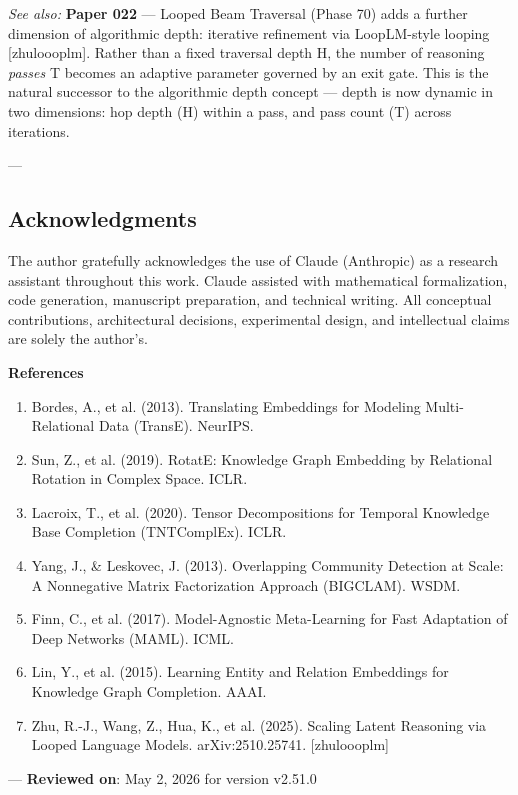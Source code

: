 \textit{See also:} \textbf{Paper 022} — Looped Beam Traversal (Phase 70) adds a further dimension of algorithmic depth: iterative refinement via LoopLM-style looping [zhu\-loooplm]. Rather than a fixed traversal depth H, the number of reasoning \textit{passes} T becomes an adaptive parameter governed by an exit gate. This is the natural successor to the algorithmic depth concept — depth is now dynamic in two dimensions: hop depth (H) within a pass, and pass count (T) across iterations.

---
\subsection{Acknow\-ledgments}

The author gratefully ackno\-wledges the use of Claude (Anthropic) as a research assistant throughout this work. Claude assisted with mathe\-matical forma\-lization, code generation, manuscript preparation, and technical writing. All conceptual contr\-ibutions, archi\-tectural decisions, exper\-imental design, and intel\-lectual claims are solely the author's.

\textbf{References}
\begin{enumerate}
\item Bordes, A., et al. (2013). Translating Embeddings for Modeling Multi-Relational Data (TransE). NeurIPS.
\item Sun, Z., et al. (2019). RotatE: Knowledge Graph Embedding by Relational Rotation in Complex Space. ICLR.
\item Lacroix, T., et al. (2020). Tensor Decomp\-ositions for Temporal Knowledge Base Completion (TNTComplEx). ICLR.
\item Yang, J., \& Leskovec, J. (2013). Overlapping Community Detection at Scale: A Nonnegative Matrix Factor\-ization Approach (BIGCLAM). WSDM.
\item Finn, C., et al. (2017). Model-Agnostic Meta-Learning for Fast Adaptation of Deep Networks (MAML). ICML.
\item Lin, Y., et al. (2015). Learning Entity and Relation Embeddings for Knowledge Graph Completion. AAAI.
\item Zhu, R.-J., Wang, Z., Hua, K., et al. (2025). Scaling Latent Reasoning via Looped Language Models. arXiv:2510.25741. [zhu\-loooplm]

\end{enumerate}
---
\textbf{Reviewed on}: May 2, 2026 for version v2.51.0
